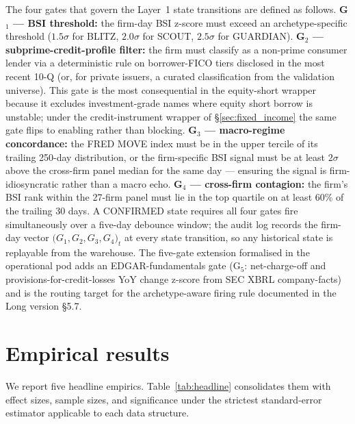 \documentclass[11pt,a4paper]{article}
\begin{document}
The four gates that govern the Layer~1 state transitions are defined as follows. \textbf{G$_1$ --- BSI threshold:} the firm-day BSI z-score must exceed an archetype-specific threshold ($1.5\sigma$ for BLITZ, $2.0\sigma$ for SCOUT, $2.5\sigma$ for GUARDIAN). \textbf{G$_2$ --- subprime-credit-profile filter:} the firm must classify as a non-prime consumer lender via a deterministic rule on borrower-FICO tiers disclosed in the most recent 10-Q (or, for private issuers, a curated classification from the validation universe). This gate is the most consequential in the equity-short wrapper because it excludes investment-grade names where equity short borrow is unstable; under the credit-instrument wrapper of §\ref{sec:fixed_income} the same gate flips to enabling rather than blocking. \textbf{G$_3$ --- macro-regime concordance:} the FRED MOVE index must be in the upper tercile of its trailing 250-day distribution, or the firm-specific BSI signal must be at least $2\sigma$ above the cross-firm panel median for the same day --- ensuring the signal is firm-idiosyncratic rather than a macro echo. \textbf{G$_4$ --- cross-firm contagion:} the firm's BSI rank within the 27-firm panel must lie in the top quartile on at least 60\% of the trailing 30 days. A CONFIRMED state requires all four gates fire simultaneously over a five-day debounce window; the audit log records the firm-day vector $\big(G_1, G_2, G_3, G_4\big)_t$ at every state transition, so any historical state is replayable from the warehouse. The five-gate extension formalised in the operational pod adds an EDGAR-fundamentals gate (G$_5$: net-charge-off and provisions-for-credit-losses YoY change z-score from SEC XBRL company-facts) and is the routing target for the archetype-aware firing rule documented in the Long version §5.7.

\section{Empirical results}\label{sec:results}

We report five headline empirics. Table~\ref{tab:headline} consolidates them with effect sizes, sample sizes, and significance under the strictest standard-error estimator applicable to each data structure.
\end{document}
